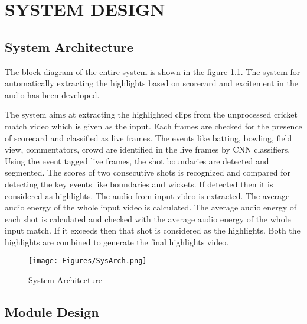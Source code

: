 
\chapter{SYSTEM DESIGN} %
\section{System Architecture}

The block diagram of the entire system is shown in the figure \ref{fig:System Architecture}. The system for automatically extracting the highlights based on scorecard and excitement in the audio has been developed.

The system aims at extracting the highlighted clips from the unprocessed cricket match video which is given as the input. Each frames are  checked for the presence of scorecard and classified as live frames. The events like batting, bowling, field view, commentators, crowd are identified in the live frames by CNN classifiers. Using the event tagged live frames, the shot boundaries are detected and segmented. The scores of two consecutive shots is recognized and compared for detecting the key events like boundaries and wickets. If detected then it is considered as highlights. The audio from input video is extracted. The average audio energy of the whole input video is calculated. The average audio energy of each shot is calculated and checked with the average audio energy of the whole input match. If it exceeds then that shot is considered as the highlights. Both the highlights are combined to generate the final highlights video.
\newpage
\begin{figure}[h]
    \centering
  \texttt{[image: Figures/SysArch.png]}
    \caption{System Architecture}
    \label{fig:System Architecture}
\end{figure}
\newpage
\section {Module Design}
